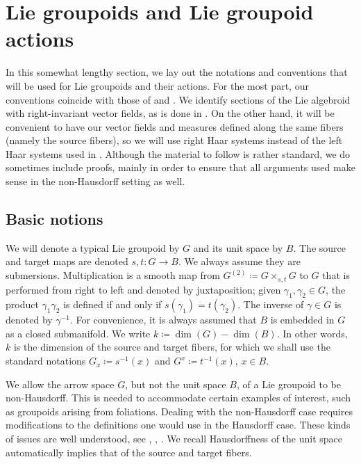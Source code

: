 \documentclass[12pt]{article}
\theoremstyle{plain}
\theoremstyle{definition}
\numberwithin{equation}{section}
\begin{document}
\section{Lie groupoids and Lie groupoid actions}



In this somewhat lengthy section, we lay out the notations and conventions that will be used for Lie groupoids and their actions. For the most part, our conventions coincide with those of \cite{Mackenzie} and \cite{Renault[BOOK]}. We identify sections of the Lie algebroid with right-invariant vector fields, as is done in \cite{Mackenzie}. On the other hand, it will be convenient to have our vector fields and measures defined along the same fibers (namely the source fibers), so we will use right Haar systems instead of the left Haar systems used in \cite{Renault[BOOK]}. Although the material to follow is rather standard, we do sometimes include proofs, mainly in order to ensure that all arguments used make sense in the non-Hausdorff setting as well.



\subsection{Basic notions}



We will denote a typical Lie groupoid by $G$ and its unit space by $B$. The source and target maps are denoted $s,t : G \to B$. We always assume they are submersions. Multiplication is a smooth map from $G^{(2)} \coloneqq G\times_{s,t}G$ to $G$  that is performed from right to left and denoted by juxtaposition; given $\gamma_1,\gamma_2 \in G$, the product $\gamma_1\gamma_2$ is defined if and only if $s(\gamma_1)=t(\gamma_2)$. The inverse of $\gamma \in G$ is denoted by $\gamma^{-1}$. For convenience, it is always assumed that $B$ is embedded in $G$ as a closed submanifold. We write $k \coloneqq \dim(G)-\dim(B)$. In other words, $k$ is the dimension of the source and target fibers, for which we shall use the standard notations  $G_x \coloneqq s^{-1}(x)$ and $G^x \coloneqq t^{-1}(x)$, $x \in B$.

We allow the arrow space $G$, but not the unit space $B$, of a Lie groupoid to be non-Hausdorff. This is needed to accommodate certain examples of interest, such as groupoids arising from foliations. 
Dealing with the non-Hausdorff case  requires   modifications to the definitions one would use in the Hausdorff case. These kinds of issues are  well understood, see  \cite{Connes[1978]}, \cite{Connes[BOOK]}, \cite{Khoshkam-Skandalis[2004]}. We recall Hausdorffness of the unit space automatically implies that of the source and target fibers.
\end{document}
